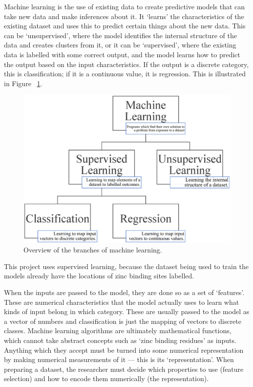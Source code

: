 Machine learning is the use of existing data to create predictive models that can take new data and make inferences about it. It `learns' the characteristics of the existing dataset and uses this to predict certain things about the new data. This can be `unsupervised', where the model identifies the internal structure of the data and creates clusters from it, or it can be `supervised', where the existing data is labelled with some correct output, and the model learns how to predict the output based on the input characteristics. If the output is a discrete category, this is classification; if it is a continuous value, it is regression. This is illustrated in Figure ~\ref{fig:machine-learning}.

\begin{figure}
\centering
\includegraphics[width=1.0\textwidth]{Figures/machine-learning.eps}
\caption{\label{fig:machine-learning} Overview of the branches of machine learning.}
\end{figure}

This project uses supervised learning, because the dataset being used to train the models already have the locations of zinc binding sites labelled. 

When the inputs are passed to the model, they are done so as a set of `features'. These are numerical characteristics that the model actually uses to learn what kinds of input belong in which category. These are usually passed to the model as a vector of numbers and classification is just the mapping of vectors to discrete classes. Machine learning algorithms are ultimately mathematical functions, which cannot take abstract concepts such as `zinc binding residues' as inputs. Anything which they accept must be turned into some numerical representation by making numerical measurements of it --- this is its `representation'. When preparing a dataset, the researcher must decide which properties to use (feature selection) and how to encode them numerically (the representation).


